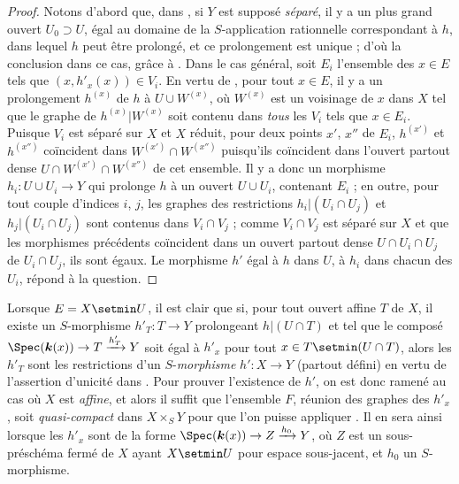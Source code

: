 \begin{proof}
Notons d'abord que, dans , si $Y$ est supposé \emph{séparé}, il y a un plus grand ouvert $U_0\supset U$, égal au domaine de la $S$-application rationnelle correspondant à $h$, dans lequel $h$ peut être prolongé, et ce prolongement est unique  ; d'où la conclusion dans ce cas, grâce à .
Dans le cas général, soit $E_i$ l'ensemble des $x\in E$ tels que $(x,h'_x(x))\in V_i$.
En vertu de , pour tout $x\in E$, il y a un prolongement $h^{(x)}$ de $h$ à $U\cup W^{(x)}$, où $W^{(x)}$ est un voisinage de $x$ dans $X$ tel que le graphe de $h^{(x)}|W^{(x)}$ soit contenu dans \emph{tous} les $V_i$ tels que $x\in E_i$.
Puisque $V_i$ est séparé sur $X$ et $X$ réduit, pour deux points $x'$, $x''$ de $E_i$, $h^{(x')}$ et $h^{(x'')}$ coïncident dans $W^{(x')}\cap W^{(x'')}$ puisqu'ils
coïncident dans l'ouvert partout dense $U\cap W^{(x')}\cap W^{(x'')}$ de cet ensemble.
Il y a donc un morphisme $h_i:U\cup U_i\to Y$ qui prolonge $h$ à un ouvert $U\cup U_i$, contenant $E_i$ ; en outre, pour tout couple d'indices $i$, $j$, les graphes des restrictions $h_i|(U_i\cap U_j)$ et $h_j|(U_i\cap U_j)$ sont contenus dans $V_i\cap V_j$ ; comme $V_i\cap V_j$ est séparé sur $X$ et que les morphismes précédents coïncident dans un ouvert partout dense $U\cap U_i\cap U_j$ de $U_i\cap U_j$, ils sont égaux.
Le morphisme $h'$ égal à $h$ dans $U$, à $h_i$ dans chacun des $U_i$, répond à la question.
\end{proof}

\begin{remark}[20.4.8]
\label{IV.20.4.8}
Lorsque $E=X\setmin U$, il est clair que si, pour tout ouvert affine $T$ de $X$, il existe un $S$-morphisme $h'_T:T\to Y$ prolongeant $h|(U\cap T)$ et tel que le composé $\Spec(\boldsymbol{k}(x))\to T\xrightarrow{h'_T}Y$ soit égal à $h'_x$ pour tout $x\in T\setmin(U\cap T)$, alors les $h'_T$ sont les restrictions d'un $S$-\emph{morphisme} $h':X\to Y$ (partout défini) en vertu de l'assertion d'unicité dans .
Pour prouver l'existence de $h'$, on est donc ramené au cas où $X$ est \emph{affine}, et alors il suffit que l'ensemble $F$, réunion des graphes des $h'_x$, soit \emph{quasi-compact} dans $X\times_S Y$ pour que l'on puisse appliquer .
Il en sera ainsi lorsque les $h'_x$ sont de la forme $\Spec(\boldsymbol{k}(x))\to Z\xrightarrow{h_0}Y$, où $Z$ est un sous-préschéma fermé de $X$ ayant $X\setmin U$ pour espace sous-jacent, et $h_0$ un $S$-morphisme.
\end{remark}

